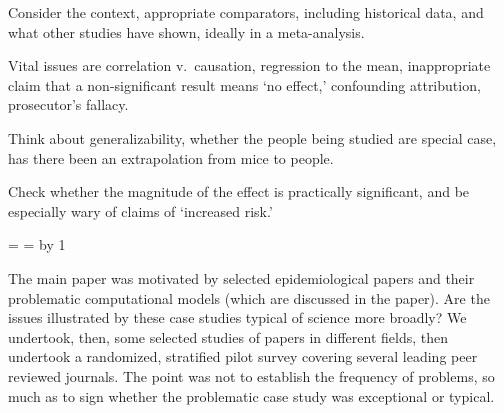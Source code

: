 \documentclass[10pt,a4paper]{article}
\begin{document}
\begin{enumerate}
\setcounter{enumi}{\value{resumeCounter}}
 Consider the context, appropriate comparators, including historical data, and what other studies have shown, ideally in a meta-analysis.


 Vital issues are correlation v.\ causation, regression to the mean, inappropriate claim that a non-significant result means `no effect,' confounding attribution, prosecutor's fallacy.


 Think about generalizability, whether the people being studied are special case, has there been an extrapolation from mice to people.


 Check whether the magnitude of the effect is practically significant, and be especially wary of claims of `increased risk.'
\end{enumerate}

\newcount\temporary \temporary=\mainNumberOfReferences
\newcount\temporaryPlusOne \temporaryPlusOne=\temporary
\advance \temporaryPlusOne by 1
\def\MaxMainPaperCitationNumber{\the\temporary}


The main paper was motivated by selected epidemiological papers and their problematic computational models (which are discussed in the paper). Are the issues illustrated by these case studies typical of science more broadly? We undertook, then, some selected studies of papers in different fields, then undertook a randomized, stratified pilot survey covering several leading peer reviewed journals. The point was not to establish the frequency of problems, so much as to sign whether the problematic case study was exceptional or typical. 
\end{document}
